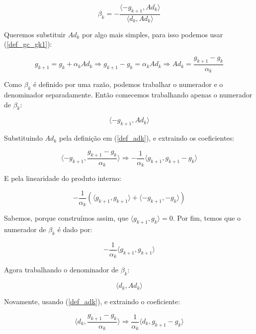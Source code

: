 \begin{equation}
\label{def_beta_gc}
\beta_k = - \frac{\langle -g_{k+1}, Ad_k \rangle}{\langle d_k, Ad_k \rangle}
\end{equation}

Queremos substituir \(Ad_k\) por algo mais simples, para isso podemos usar (\ref{def_gc_gk1}):

\begin{equation}
\label{def_adk}
g_{k+1} = g_k + \alpha_k A d_k \Rightarrow g_{k+1} - g_k = \alpha_k A d_k \Rightarrow A d_k = \frac{g_{k+1} - g_k}{\alpha_k}
\end{equation}

Como \(\beta_k\) é definido por uma razão, podemos trabalhar o numerador e o denominador
separadamente. Então comecemos trabalhando apenas o numerador de \(\beta_k\):

\begin{equation}
\langle -g_{k+1}, Ad_k \rangle
\end{equation}

Substituindo \(Ad_k\) pela definição em (\ref{def_adk}), e extraindo os coeficientes:

\begin{equation}
\langle -g_{k+1}, \frac{g_{k+1} - g_k}{\alpha_k} \rangle \Rightarrow -\frac{1}{\alpha_k} \langle g_{k+1}, g_{k+1} - g_k \rangle
\end{equation}

E pela linearidade do produto interno:

\begin{equation}
-\frac{1}{\alpha_k}(\langle g_{k+1}, g_{k+1} \rangle + \langle -g_{k+1}, - g_k \rangle)
\end{equation}


Sabemos, porque construímos assim, que \(\langle g_{k+1}, g_k \rangle = 0\). Por fim, temos que o
numerador de \(\beta_k\) é dado por:

\begin{equation}
\label{def_gc_numerador}  
-\frac{1}{\alpha_k} \langle g_{k+1}, g_{k+1} \rangle
\end{equation}

Agora trabalhando o denominador de \(\beta_k\):

\begin{equation}
\langle d_k, Ad_k \rangle
\end{equation}


Novamente, usando (\ref{def_adk}), e extraindo o coeficiente:

\begin{equation}
\langle d_k, \frac{g_{k+1} - g_k}{\alpha_k} \rangle \Rightarrow \frac{1}{\alpha_k}\langle d_k, g_{k+1} - g_k \rangle
\end{equation}


